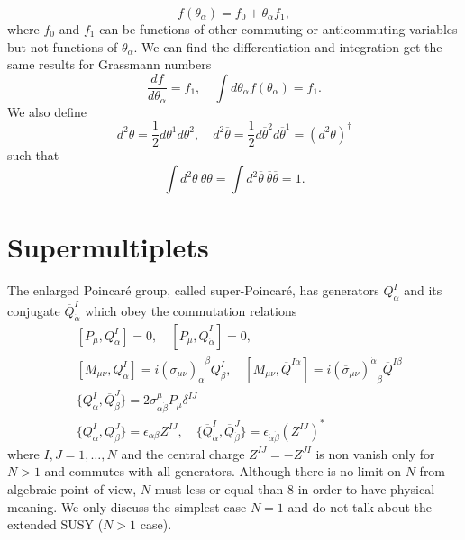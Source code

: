 \documentclass[12pt]{report}
\begin{document}
\begin{equation}
f(\theta_{\alpha}) = f_{0} + \theta_{\alpha} f_{1} ,
\end{equation}
where $f_{0}$ and $f_{1}$ can be functions of other commuting or anticommuting variables but not functions of $\theta_{\alpha}$.
We can find the differentiation and integration get the same results for Grassmann numbers
\begin{equation}
\frac{df}{d\theta_{\alpha}} = f_{1}, \quad \int d\theta_{\alpha} f(\theta_{\alpha}) = f_{1} .
\end{equation}
We also define
\begin{equation}
d^{2} \theta = \frac{1}{2} d\theta^{1} d\theta^{2}, \quad  
d^{2}\overline{\theta} = \frac{1}{2} d\overline{\theta}^{2} d\overline{\theta}^{1} = (d^{2} \theta)^{\dag}
\end{equation}
such that
\begin{equation}
\int d^{2} \theta \ \theta \theta = \int d^{2} \overline{\theta} \ \overline{\theta} \overline{\theta} = 1 .
\end{equation}



\section{Supermultiplets} \label{sec: supermultiplets}
The enlarged Poincar\'{e} group, called super-Poincar\'{e}, has generators $Q^{I}_{\alpha}$ and its conjugate $\overline{Q}^{I}_{\dot{\alpha}}$ which obey the commutation relations
\begin{align}
& [P_{\mu}, Q^{I}_{\alpha}] = 0, \quad 
[P_{\mu}, \overline{Q}^{I}_{\dot{\alpha}}] = 0,\\
& [M_{\mu \nu}, Q^{I}_{\alpha}] = i {(\sigma_{\mu \nu})_{\alpha}}^{\beta} Q^{I}_{\beta}, \quad 
[M_{\mu \nu}, \overline{Q}^{I\dot{\alpha}}] = i {(\overline{\sigma}_{\mu \nu})^{\dot{\alpha}}}_{\dot{\beta}} \overline{Q}^{I \dot{\beta}}\\
& \{Q^{I}_{\alpha}, \overline{Q}^{J}_{\dot{\beta}}\} = 2 \sigma^{\mu}_{\alpha \dot{\beta}} P_{\mu} \delta^{IJ}\\
& \{Q^{I}_{\alpha}, Q^{J}_{\beta}\} = \epsilon_{\alpha \beta} Z^{IJ}, \quad 
\{\overline{Q}^{I}_{\dot{\alpha}}, \overline{Q}^{J}_{\dot{\beta}}\} = \epsilon_{\dot{\alpha} \dot{\beta}} (Z^{IJ})^{*}
\end{align}
where $I, J = 1, \dots, N$ and the central charge $Z^{IJ} = -Z^{JI}$ is non vanish only for $N > 1$ and commutes with all generators.
Although there is no limit on $N$ from algebraic point of view, $N$ must less or equal than $8$ in order to have physical meaning.
We only discuss the simplest case $N = 1$ and do not talk about the extended SUSY ($N > 1$ case).
\end{document}
